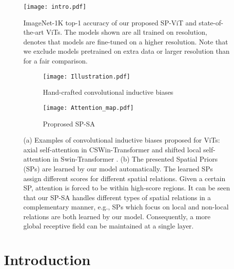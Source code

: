 \documentclass[authorversion, sigconf, acmthm=false, nonacm=true]{acmart}
\begin{document}
\maketitle
 \pagestyle{plain}

\begin{figure}[t]
  \centering
  \texttt{[image: intro.pdf]} \caption{ImageNet-1K top-1 accuracy of our proposed SP-ViT and state-of-the-art ViTs. 
  The models shown are all trained on  resolution,  denotes that models are fine-tuned on a higher resolution.
  Note that we exclude models pretrained on extra data or larger resolution than  for a fair comparison.
} 
  \label{fig:intro}
\end{figure}

\begin{figure*}[t]
  \centering
  \begin{subfigure}[b]{0.56\textwidth}
      \texttt{[image: Illustration.pdf]}
      \caption{Hand-crafted convolutional inductive biases}
      \label{rfidtest_xaxis}
  \end{subfigure}
  \begin{subfigure}[b]{0.42\textwidth}
      \texttt{[image: Attention\_map.pdf]}
      \caption{Proprosed SP-SA}
      \label{rfidtest_xaxis}
  \end{subfigure}
  \caption{(a) Examples of convolutional inductive biases proposed for ViTs: axial self-attention in CSWin-Transformer \cite{dong2021cswin} and shifted local self-attention in Swin-Transformer \cite{liu2021swin}.
  (b) The presented Spatial Priors (SPs) are learned by our model automatically. The learned SPs
  assign different scores for different spatial relations. Given a certain SP, attention is forced to be within high-score regions. 
  It can be seen that our SP-SA handles different types of spatial relations in a complementary manner, e.g., SPs which focus on local and non-local relations are both learned by our model. 
  Consequently, a more global receptive field can be maintained at a single layer.}
\label{fig1}
\end{figure*}
\section{Introduction}
\label{sec:intro}
\end{document}
